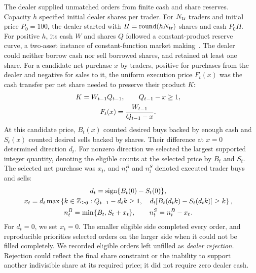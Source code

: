 The dealer supplied unmatched orders from finite cash and share reserves.
Capacity $h$ specified initial dealer shares per trader. For $N_{\rm tr}$
traders and initial price $P_0=100$, the dealer started with
$H=\operatorname{round}(hN_{\rm tr})$ shares and cash $P_0H$.
For positive $h$, its cash $W$ and shares $Q$ followed a constant-product
reserve curve, a two-asset instance of constant-function market
making~\cite{angeris2022constant}. The dealer could neither borrow cash
nor sell borrowed shares, and retained at least one share. For a candidate
net purchase $x$ by traders, positive for purchases from the dealer and
negative for sales to it, the uniform execution price $F_t(x)$ was the
cash transfer per net share needed to preserve their product $K$:
\begin{gather}
 K=W_{t-1}Q_{t-1},\qquad Q_{t-1}-x\geq1,\notag\\
 F_t(x)=\frac{W_{t-1}}{Q_{t-1}-x}.
 \label{eq:execution-price}
\end{gather}
At this candidate price, $B_t(x)$ counted desired buys backed by enough
cash and $S_t(x)$ counted desired sells backed by shares. Their difference
at $x=0$ determined direction $d_t$. For nonzero direction we selected
the largest supported integer quantity, denoting the eligible counts at the
selected price by $B_t$ and $S_t$. The selected net purchase was $x_t$,
and $n_t^B$ and $n_t^S$ denoted executed trader buys and sells:
\begin{gather}
 d_t=\operatorname{sign}\{B_t(0)-S_t(0)\},\notag\\
 x_t=d_t\max\left\{k\in\mathbb{Z}_{\geq0}:
 Q_{t-1}-d_tk\geq1,\quad
 d_t[B_t(d_tk)-S_t(d_tk)]\geq k\right\},
 \label{eq:dealer-buy-excess}\\
 n_t^B=\min\{B_t,S_t+x_t\},\qquad n_t^S=n_t^B-x_t.
 \label{eq:dealer-sell-excess}
\end{gather}
For $d_t=0$, we set $x_t=0$. The smaller eligible side completed every
order, and reproducible priorities selected orders on the larger side
when it could not be filled completely. We recorded eligible orders left
unfilled as \emph{dealer rejection}. Rejection could reflect the final
share constraint or the inability to support another indivisible share
at its required price; it did not require zero dealer cash.

